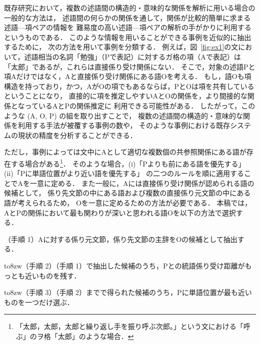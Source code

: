 \documentclass[japanese]{jnlp_1.4}
\begin{document}
既存研究において，複数の述語間の構造的・意味的な関係を解析に用いる場合の一般的な方法は，
述語間の何らかの関係を通して，関係が比較的簡単に求まる述語—項ペアの情報を
難易度の高い述語—項ペアの解析の手がかりに利用するというものである．
このような情報を用いることができる事例を近似的に抽出するために，
次の方法を用いて事例を分類する．
例えば，図~\ref{fig:ex1}の文において，述語相当の名詞「勉強」（Pで表記）に対するガ格の項（Aで表記）は
「太郎」であるが，これらは直接係り受け関係にない．
そこで，対象の述語Pと項Aだけではなく，Aと直接係り受け関係にある語Oを考える．
もし，語Oも項構造を持っており，かつ，AがOの項でもあるならば，PとOは項を共有しているということになり，
直接的に項を推定しやすいAとOの関係を，より間接的な関係となっているAとPの関係推定に
利用できる可能性がある． 
したがって，このような (A, O, P) の組を取り出すことで，
複数の述語間の構造的・意味的な関係を利用する手法が被覆する事例の数や，
そのような事例における既存システムの現状の精度を分析することができる．

ただし，事例によっては文中にAとして適切な複数個の共参照関係にある語が存在する場合がある\footnote{「太郎，太郎，太郎と繰り返し手を振り呼ぶ次郎。」という文における「呼ぶ」のヲ格「太郎」のような場合．}．
そのような場合，(i)「Pよりも前にある語を優先する」
(ii)「Pに単語位置がより近い語を優先する」
の二つのルールを順に適用することでAを一意に定める．
また一般に，Aには直接係り受け関係が認められる語の候補として，
係り先文節の中にある語および複数の直接係り元文節の中にある語が考えられるため，
Oを一意に定めるための方法が必要である．
本稿では，AとPの関係において最も関わりが深いと思われる語Oを以下の方法で選択する．

\noindent
（手順 1）Aに対する係り元文節，係り先文節の主辞をOの候補として抽出する．

\noindent
\hbox to8zw{（手順 2）（手順 1）\hfil}で抽出した候補のうち，Pとの統語係り受け距離がもっとも近いものを残す．

\noindent
\hbox to8zw{（手順 3）（手順 2）\hfil}までで得られた候補のうち，Pに単語位置が最も近いものを一つだけ選ぶ．
\end{document}
